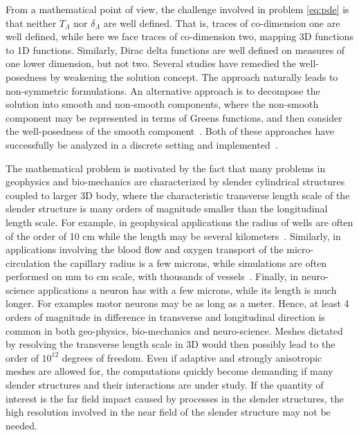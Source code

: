 \documentclass[r]{siamart171218}
\begin{document}
From a mathematical point of view, the challenge involved in problem \eqref{eq:pde} is that neither $T_\Lambda$ nor $\delta_\Lambda$ are well defined. That is, traces of co-dimension one are well defined, while here we face traces of co-dimension two, mapping 3D functions to 1D functions. Similarly, Dirac delta functions are well defined on measures of one lower dimension, but not two. Several studies \cite{DAngelo,..} have remedied the well-posedness by weakening the solution concept. The approach naturally leads to non-symmetric formulations. An alternative approach is to decompose the solution into smooth and non-smooth components, where the non-smooth component may be represented in terms of Greens functions, and then consider the well-posedness of the smooth component~\cite{Peaceman1983531,secomb2004green}. Both of these approaches have successfully be analyzed in a discrete setting and implemented~\cite{}. 


The mathematical problem is motivated by the fact that many problems in geophysics and bio-mechanics are characterized by slender cylindrical structures coupled to larger 3D body, where the characteristic transverse length scale of the slender structure is many orders of magnitude smaller than the longitudinal length scale.  For example, in geophysical applications the radius of wells are often of the order of 10 cm while the length may be several kilometers~\cite{gjerde2019singularity}. Similarly, in applications involving the blood flow and oxygen transport of the micro-circulation the capillary radius is a few microns, while simulations are often performed on mm to cm scale, with thousands of vessels~\cite{berg2020modelling,fang2008oxygen,gould2017capillary}. Finally, in neuro-science applications a neuron has with a few microns, while  its length is much longer. For examples motor neurons may be as long as a meter.  Hence,  at least 4 orders of magnitude in difference in transverse and longitudinal direction is common in both geo-physics, bio-mechanics and neuro-science. Meshes dictated by resolving the transverse length scale in 3D would then possibly lead to the order of $10^{12}$ degrees of freedom. Even if adaptive and strongly anisotropic meshes are allowed for, the computations quickly become demanding if many slender structures and their interactions are under study.  If the quantity of interest is the far field impact caused by processes in the slender structures, the high resolution involved in the near field of the slender structure may not be needed.  
\end{document}
